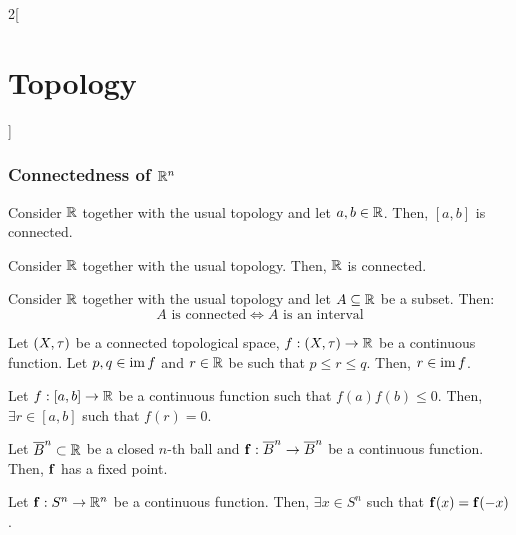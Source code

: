 \documentclass[../../../main.tex]{subfiles}
\begin{document}
\begin{multicols}{2}[\section{Topology}]
    \subsubsection{Connectedness of \texorpdfstring{$\mathbb{R}^n$}{Rn}}
    \begin{theorem}
        Consider $\mathbb{R}$ together with the usual topology and let $a,b\in\mathbb{R}$. Then, $[a,b]$ is connected.
    \end{theorem}
    \begin{theorem}
        Consider $\mathbb{R}$ together with the usual topology. Then, $\mathbb{R}$ is connected.
    \end{theorem}
    \begin{theorem}
        Consider $\mathbb{R}$ together with the usual topology and let $A\subseteq \mathbb{R}$ be a subset. Then: $$A\text{ is connected}\iff A\text{ is an interval}$$
    \end{theorem}
    \begin{theorem}
        Let $(X,\tau)$ be a connected topological space, $f:(X,\tau)\rightarrow\mathbb{R}$ be a continuous function. Let $p,q\in \operatorname{im} f$ and $r\in \mathbb{R}$ be such that $p\leq r\leq q$. Then, $r\in \operatorname{im} f$.
    \end{theorem}
    \begin{corollary}
        Let $f:[a,b]\rightarrow\mathbb{R}$ be a continuous function such that $f(a)f(b)\leq 0$. Then, $\exists r\in [a,b]$ such that $f(r)=0$.
    \end{corollary}
    \begin{theorem}
        Let $\overline{B}^n\subset\mathbb{R}$ be a closed $n$-th ball and $\boldsymbol{\mathrm{f}}:\overline{B}^n\rightarrow\overline{B}^n$ be a continuous function. Then, $\boldsymbol{\mathrm{f}}$ has a fixed point.
    \end{theorem}
    \begin{theorem}
        Let $\boldsymbol{\mathrm{f}}:S^n\rightarrow\mathbb{R}^n$ be a continuous function. Then, $\exists x\in S^n$ such that $\boldsymbol{\mathrm{f}}(x)=\boldsymbol{\mathrm{f}}(-x)$.
    \end{theorem}

\end{multicols}
\end{document}
